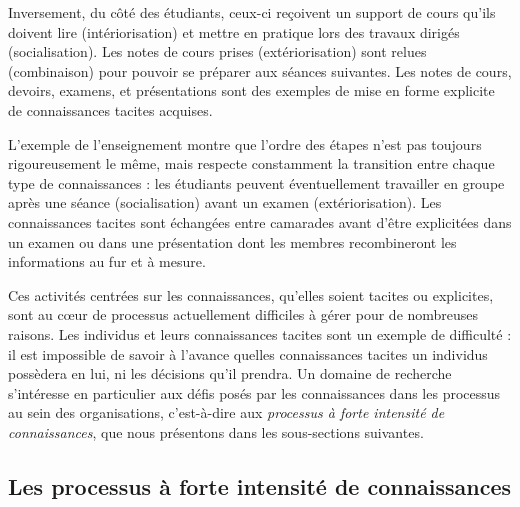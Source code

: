 Inversement, du côté des étudiants, ceux-ci reçoivent un support de cours qu'ils doivent lire (intériorisation) et mettre en pratique lors des travaux dirigés (socialisation).
Les notes de cours prises (extériorisation) sont relues (combinaison) pour pouvoir se préparer aux séances suivantes.
Les notes de cours, devoirs, examens, et présentations sont des exemples de mise en forme explicite de connaissances tacites acquises.

\bigskip

L'exemple de l'enseignement montre que l'ordre des étapes n'est pas toujours rigoureusement le même, mais respecte constamment la transition entre chaque type de connaissances : les étudiants peuvent éventuellement travailler en groupe après une séance (socialisation) avant un examen (extériorisation).
Les connaissances tacites sont échangées entre camarades avant d'être explicitées dans un examen ou dans une présentation dont les membres recombineront les informations au fur et à mesure.

\bigskip

Ces activités centrées sur les connaissances, qu'elles soient tacites ou explicites, sont au c\oe{}ur de processus actuellement difficiles à gérer pour de nombreuses raisons.
Les individus et leurs connaissances tacites sont un exemple de difficulté : il est impossible de savoir à l'avance quelles connaissances tacites un individus possèdera en lui, ni les décisions qu'il prendra.
Un domaine de recherche s'intéresse en particulier aux défis posés par les connaissances dans les processus au sein des organisations, c'est-à-dire aux \textit{processus à forte intensité de connaissances}, que nous présentons dans les sous-sections suivantes.


\bigskip


\subsection{Les processus à forte intensité de connaissances}
\label{subsection:Contexte:KIP-RevueLitterature:KIP}

